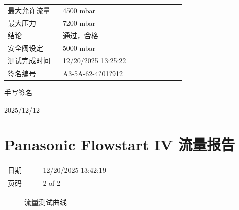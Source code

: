 \documentclass[UTF8,10pt,a4paper,fontset=fandol]{ctexart}
\newcommand{\fieldvalue}[1]{#1}
\newcommand{\handwritten}[1]{#1}
\begin{document}
\begin{tabular}{@{}p{0.28\linewidth}p{0.62\linewidth}@{}}
最大允许流量 &
\fieldvalue{4500 mbar} \\

最大压力 &
\fieldvalue{7200 mbar} \\

结论 &
\fieldvalue{通过，合格} \\

安全阀设定 &
\fieldvalue{5000 mbar} \\

测试完成时间 &
\fieldvalue{12/20/2025 13:25:22} \\

签名编号 &
\fieldvalue{A3-5A-62-4?01?912} \\
\end{tabular}

\fieldvalue{\handwritten{手写签名}}

\fieldvalue{\handwritten{2025/12/12}}

\section{Panasonic Flowstart IV 流量报告}

\begin{tabular}{@{}p{0.28\linewidth}p{0.62\linewidth}@{}}
日期 &
\fieldvalue{12/20/2025 13:42:19} \\

页码 &
\fieldvalue{2 of 2} \\
\end{tabular}

\begin{figure}[ht]
\centering
{}
\caption{流量测试曲线}
\end{figure}
\end{document}
